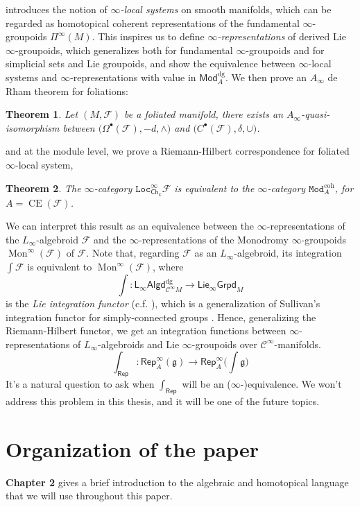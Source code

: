 \documentclass[12pt]{amsart}
\newtheorem{theorem}{Theorem}[section]
\theoremstyle{definition}
\theoremstyle{remark}
\numberwithin{equation}{section}
\newcommand{\CF}{{\mathcal F}}
\newcommand{\cinf}{{\mathcal C}^{\infty}}
\newcommand{\A}{{A}}
\newcommand{\1}{{\mathbb{1}}}
\newcommand{\g}{\mathfrak{g}}
\newcommand{\CE}{\operatorname{CE}}
\newcommand{\Mod}{\mathsf{Mod}}
\newcommand{\Modi}{\mathtt{Mod}}
\newcommand{\Ch}{\mathsf{Ch}}
\newcommand{\rep}{\mathsf{Rep}}
\newcommand{\loci}{\mathtt{Loc}}
\newcommand{\ilgpd}{\mathsf{Lie_{\infty}Grpd}}
\newcommand{\lalgd}{\mathsf{L_{\infty}Algd}^{\operatorname{dg}}}
\newcommand{\dg}{{\operatorname{dg}}}
\newcommand{\coh}{{\operatorname{coh}}}
\newcommand{\mon}{\operatorname{Mon}}
\begin{document}
\cite{BS14} introduces the notion of {\it $\infty$-local systems} on smooth manifolds, which can be regarded as homotopical coherent representations of the fundamental $\infty$-groupoids $\Pi^{\infty}(M)$. This inspires us to define {\it $\infty$-representations} of derived Lie $\infty$-groupoids, which generalizes both \cite{BS14} for fundamental $\infty$-groupoids and \cite{AC11} for simplicial sets and Lie groupoids, and show the equivalence between $\infty$-local systems and $\infty$-representations with value in $\Mod^{\dg}_A$. We then prove an $A_{\infty}$ de Rham theorem for foliations:
\begin{theorem}
    	Let $(M, \CF)$ be a foliated manifold, there exists an $A_{\infty}$-quasi-isomorphism between $\big(\Omega^{\bullet}(\CF), -d, \wedge \big)$ and $\big(C^{\bullet}(\CF), \delta, \cup \big)$. 
\end{theorem}
and at the module level, we prove a Riemann-Hilbert correspondence for foliated $\infty$-local system,  
\begin{theorem}
    The $\infty$-category $\loci^{\infty}_{\Ch_k}\CF$ is equivalent to the $\infty$-category $\Modi_{\A}^{\coh}$, for $\A = \CE(\CF)$.
\end{theorem}
We can interpret this result as an equivalence between the  $\infty$-representations of the $L_{\infty}$-algebroid $\CF$ and the $\infty$-representations of the Monodromy $\infty$-groupoids $\mon^{\infty}(\CF)$ of $\CF$. Note that, regarding $\CF$ as an $L_{\infty}$-algebroid, its integration $\int \CF$ is equivalent to $\mon^{\infty}(\CF)$, where
\begin{equation*}
    \int: \lalgd_{\cinf{M}} \to \ilgpd_M
\end{equation*}
is the {\it Lie integration functor} (c.f. \cite{Hen08}\cite{SS19}\cite{RZ20}), which is a generalization of Sullivan's integration functor for simply-connected groups \cite{Sul77}. Hence, generalizing the Riemann-Hilbert functor, we get an integration functions between $\infty$-representations of $L_{\infty}$-algebroids and Lie $\infty$-groupoids over $\cinf$-manifolds.
\begin{equation*}
    \int_{\rep}: \rep^{\infty}_A(\g) \to \rep^{\infty}_A\big(\int \g \big)
\end{equation*}
It's a natural question to ask when $\int_{\rep}$ will  be an ($\infty$-)equivalence. We won't address this problem in this thesis, and it will be one of the future topics.

\section{Organization of the paper}
{\bf Chapter 2} gives a brief introduction to the algebraic and homotopical language that we will use throughout this paper.
\end{document}
